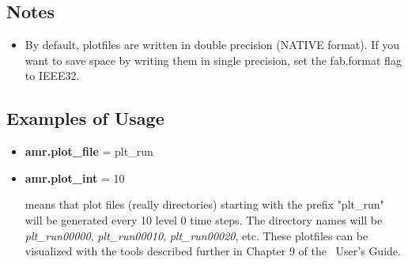 \subsection{Notes}

\begin{itemize}

\item By default, plotfiles are written in double precision (NATIVE format).  If you want to 
save space by writing them in single precision, set the fab.format flag to IEEE32.

\end{itemize}

\subsection{Examples of Usage}

\begin{itemize}

\item {\bf amr.plot\_file} = plt\_run
\item {\bf amr.plot\_int} = 10

means that plot files (really directories) starting with the prefix "plt\_run" will be
generated every 10 level 0 time steps.  The directory names will be {\it plt\_run00000}, 
{\it plt\_run00010}, {\it plt\_run00020}, etc.  These plotfiles can be visualized with the
tools described further in Chapter 9 of the \amrex\ User's Guide.

\end{itemize}

